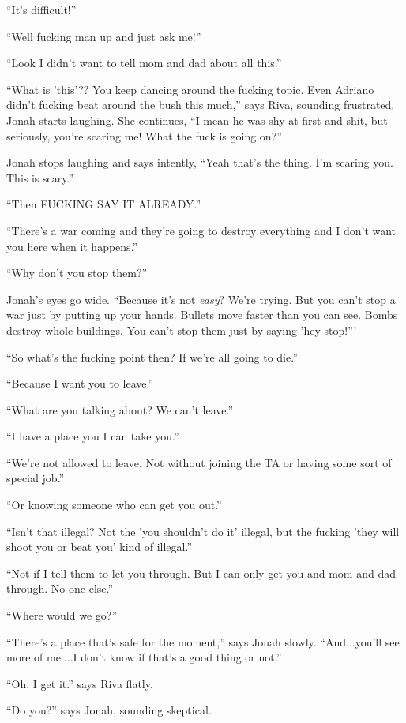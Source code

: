 ``It's difficult!''

``Well fucking man up and just ask me!''

``Look I didn't want to tell mom and dad about all this.''

``What is 'this'??  You keep dancing around the fucking topic.  Even Adriano didn't fucking beat around the bush this much,'' says Riva, sounding frustrated.  Jonah starts laughing.   She continues, ``I mean he was shy at first and shit, but seriously, you're scaring me!  What the fuck is going on?''

Jonah stops laughing and says intently, ``Yeah that's the thing.  I'm scaring you.  This is scary.''

``Then FUCKING SAY IT ALREADY.''

``There's a war coming and they're going to destroy everything and I don't want you here when it happens.''

``Why don't you stop them?''

Jonah's eyes go wide.  ``Because it's not \textit{easy}?  We're trying.  But you can't stop a war just by putting up your hands.  Bullets move faster than you can see.  Bombs destroy whole buildings.  You can't stop them just by saying 'hey stop!'''

``So what's the fucking point then?  If we're all going to die.''

``Because I want you to leave.''

``What are you talking about?  We can't leave.''

``I have a place you I can take you.''

``We're not allowed to leave.  Not without joining the TA or having some sort of special job.''

``Or knowing someone who can get you out.''

``Isn't that illegal?  Not the 'you shouldn't do it' illegal, but the fucking 'they will shoot you or beat you' kind of illegal.''

``Not if I tell them to let you through.  But I can only get you and mom and dad through.  No one else.''

``Where would we go?''

``There's a place that's safe for the moment,'' says Jonah slowly.  ``And...you'll see more of me....I don't know if that's a good thing or not.''

``Oh.  I get it.'' says Riva flatly.

``Do you?'' says Jonah, sounding skeptical.

